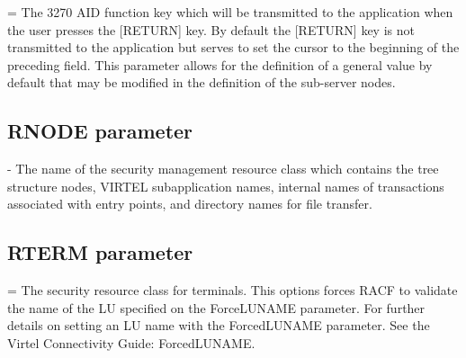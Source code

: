 \documentclass[letterpaper,10pt,english]{sphinxmanual}
\begin{document}
 = The 3270 AID function key which will be transmitted to the application when the user presses the {[}RETURN{]} key. By default the {[}RETURN{]} key is not transmitted to the application but serves to set the cursor to the beginning of the preceding field. This parameter allows for the definition of a general value by default that may be modified in the definition of the sub-server nodes.

\ignorespaces 

\subsection{RNODE parameter}
\label{\detokenize{Installation_Guide:rnode-parameter}}\label{\detokenize{Installation_Guide:index-110}}
\begin{sphinxVerbatim}[commandchars=\\\{\}]
 
\end{sphinxVerbatim}

 - The name of the security management resource class which contains the tree structure nodes, VIRTEL subapplication names, internal names of transactions associated with entry points, and directory names for file transfer.

\ignorespaces 

\subsection{RTERM parameter}
\label{\detokenize{Installation_Guide:rterm-parameter}}\label{\detokenize{Installation_Guide:index-111}}
\begin{sphinxVerbatim}[commandchars=\\\{\}]
\end{sphinxVerbatim}

 = The security resource class for terminals. This options forces RACF to validate the name of the LU specified on the ForceLUNAME parameter. For further details on setting an LU name with the ForcedLUNAME parameter. See the Virtel Connectivity Guide: ForcedLUNAME.
\end{document}
